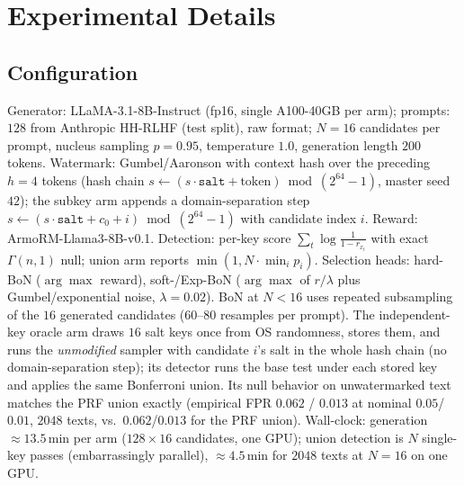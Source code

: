 \documentclass{article} %
\begin{document}
\section{Experimental Details}\label{app:exp}

\subsection{Configuration}
Generator: LLaMA-3.1-8B-Instruct (fp16, single A100-40GB per arm); prompts: $128$
from Anthropic HH-RLHF (test split), raw format; $N{=}16$ candidates per prompt,
nucleus sampling $p{=}0.95$, temperature $1.0$, generation length $200$ tokens.
Watermark: Gumbel/Aaronson with context hash over the preceding $h{=}4$ tokens
(hash chain $s\!\leftarrow\!(s\cdot\texttt{salt}+\mathrm{token})\bmod(2^{64}{-}1)$,
master seed $42$); the subkey arm appends a domain-separation step
$s\!\leftarrow\!(s\cdot\texttt{salt}+c_0+i)\bmod(2^{64}{-}1)$ with candidate index
$i$. Reward: ArmoRM-Llama3-8B-v0.1. Detection: per-key score
$\sum_t\log\frac{1}{1-r_{x_t}}$ with exact $\Gamma(n,1)$ null; union arm reports
$\min(1,N\cdot\min_i p_i)$. Selection heads: hard-BoN ($\arg\max$ reward),
soft-/Exp-BoN ($\arg\max$ of $r/\lambda$ plus Gumbel/exponential noise,
$\lambda{=}0.02$). BoN at $N<16$ uses repeated subsampling of the $16$ generated
candidates ($60$--$80$ resamples per prompt). The independent-key oracle arm
draws $16$ salt keys once from OS randomness, stores them, and runs the
\emph{unmodified} sampler with candidate $i$'s salt in the whole hash chain
(no domain-separation step); its detector runs the base test under each
stored key and applies the same Bonferroni union. Its null behavior on
unwatermarked text matches the PRF union exactly (empirical FPR $0.062$ /
$0.013$ at nominal $0.05$/$0.01$, $2048$ texts, vs.\ $0.062$/$0.013$ for the
PRF union). Wall-clock: generation
$\approx13.5$\,min per arm ($128\times16$ candidates, one GPU); union detection is
$N$ single-key passes (embarrassingly parallel), $\approx4.5$\,min for
$2048$ texts at $N{=}16$ on one GPU.
\end{document}
